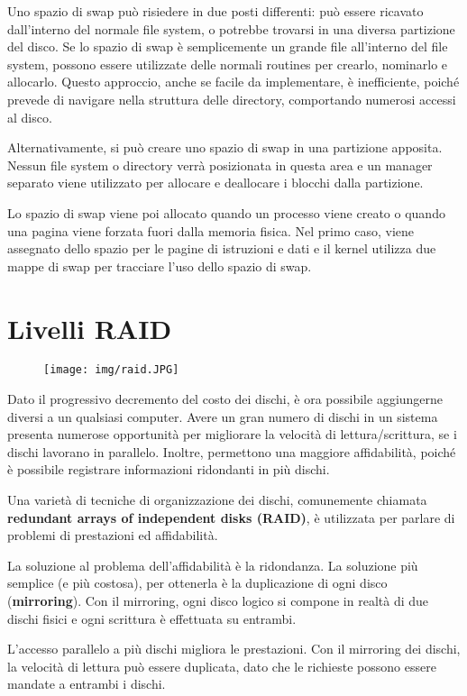 \documentclass[a4paper]{article}
\begin{document}
Uno spazio di swap può risiedere in due posti differenti: può essere ricavato dall'interno del normale file system, o potrebbe trovarsi in una diversa partizione del disco. Se lo spazio di swap è semplicemente un grande file all'interno del file system, possono essere utilizzate delle normali routines per crearlo, nominarlo e allocarlo. Questo approccio, anche se facile da implementare, è inefficiente, poiché prevede di navigare nella struttura delle directory, comportando numerosi accessi al disco.

Alternativamente, si può creare uno spazio di swap in una partizione apposita. Nessun file system o directory verrà posizionata in questa area e un manager separato viene utilizzato per allocare e deallocare i blocchi dalla partizione.

Lo spazio di swap viene poi allocato quando un processo viene creato o quando una pagina viene forzata fuori dalla memoria fisica. Nel primo caso, viene assegnato dello spazio per le pagine di istruzioni e dati e il kernel utilizza due mappe di swap per tracciare l'uso dello spazio di swap.


\section{Livelli RAID}

\begin{figure}[h!]
    \centering
    \texttt{[image: img/raid.JPG]}
\end{figure}

Dato il progressivo decremento del costo dei dischi, è ora possibile aggiungerne diversi a un qualsiasi computer. Avere un gran numero di dischi in un sistema presenta numerose opportunità per migliorare la velocità di lettura/scrittura, se i dischi lavorano in parallelo. Inoltre, permettono una maggiore affidabilità, poiché è possibile registrare informazioni ridondanti in più dischi.

Una varietà di tecniche di organizzazione dei dischi, comunemente chiamata \textbf{redundant arrays of independent disks (RAID)}, è utilizzata per parlare di problemi di prestazioni ed affidabilità.

La soluzione al problema dell'affidabilità è la ridondanza. La soluzione più semplice (e più costosa), per ottenerla è la duplicazione di ogni disco (\textbf{mirroring}). Con il mirroring, ogni disco logico si compone in realtà di due dischi fisici e ogni scrittura è effettuata su entrambi.

L'accesso parallelo a più dischi migliora le prestazioni. Con il mirroring dei dischi, la velocità di lettura può essere duplicata, dato che le richieste possono essere mandate a entrambi i dischi.
\end{document}
